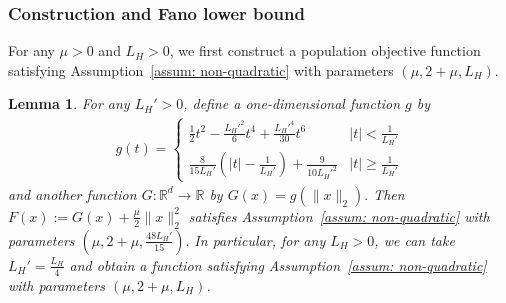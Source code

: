 \documentclass[11pt,twoside]{article}
\numberwithin{equation}{section}
\newcommand{\RR}{\mathbb{R}}
\newcommand{\1}{\mathbf{1}}
\newtheorem{lemma}[theorem]{Lemma}
\theoremstyle{remark}
\theoremstyle{plain}
\newcommand{\liph}{L_H}
\begin{document}
\subsubsection{Construction and Fano lower bound}
For any $\mu >0$ and $\liph > 0$, we first construct a population objective function satisfying Assumption~\ref{assum: non-quadratic} with parameters $(\mu, 2+\mu, \liph).$
\begin{lemma}\label{lem:function_justify_liph}
	For any $\liph' >0$, define a one-dimensional function $g$ by
	\begin{align*}
		g(t) = \begin{cases}
			\frac{1}{2} t^2 - \frac{\liph'^2}{6} t^4  + \frac{\liph'^4}{30} t^6 & |t| < \frac{1}{\liph'}\\
			\frac{8}{15\liph'}\left(|t| - \frac{1}{\liph'} \right) + \frac{9}{10\liph'^2} & |t| \ge \frac{1}{\liph'}
		\end{cases}
	\end{align*}
	and another function $G \colon \RR^d \rightarrow \RR$ by $G(x) = g(\|x\|_2).$  Then $ F(x) := G(x) + \frac{\mu}{2}\|x\|_2^2$ satisfies Assumption~\ref{assum: non-quadratic} with parameters $(\mu, 2+\mu, \frac{48\liph'}{15}).$ In particular, for any $\liph >0$, we can take $\liph' = \frac{ \liph}{4}$ and obtain a function satisfying Assumption~\ref{assum: non-quadratic} with parameters $(\mu, 2+\mu, \liph)$.
\end{lemma}
\end{document}
